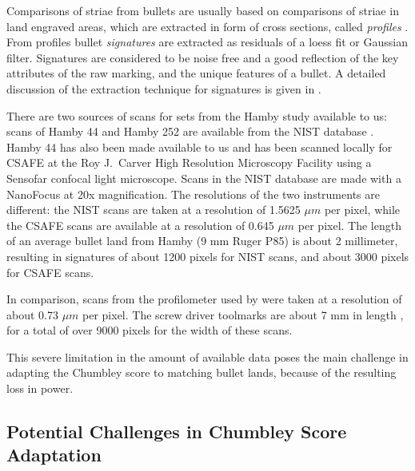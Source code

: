 \documentclass[12pt]{article}
\begin{document}
Comparisons of striae from bullets are usually based on comparisons of
striae in land engraved areas, which are extracted in form of cross
sections, called \emph{profiles} \citep{aoas,ma2004}. From profiles
bullet \emph{signatures} \citep{chu2013,aoas} are extracted as residuals
of a loess fit or Gaussian filter. Signatures are considered to be noise
free and a good reflection of the key attributes of the raw marking, and
the unique features of a bullet.
 A detailed
discussion of the extraction technique for signatures is given in
\citet{aoas}.

There are two sources of scans for sets from the Hamby study available
to us: scans of Hamby 44 and Hamby 252 are available from the NIST
database \citep{nist}. Hamby 44 has also been made available to us and
has been scanned locally for CSAFE at the Roy J.~Carver High Resolution
Microscopy Facility using a Sensofar confocal light microscope. Scans in
the NIST database are made with a NanoFocus at 20x magnification. The
resolutions of the two instruments are different: the NIST scans are
taken at a resolution of 1.5625 \(\mu m\) per pixel, while the CSAFE
scans are available at a resolution of 0.645 \(\mu m\) per pixel. The
length of an average bullet land from Hamby (9 mm Ruger P85) is about 2
millimeter, resulting in signatures of about 1200 pixels for NIST scans,
and about 3000 pixels for CSAFE scans.

In comparison, scans from the profilometer used by
\citet{chumbley, hadler} were taken at a resolution of about 0.73
\(\mu m\) per pixel. The screw driver toolmarks are about 7 mm in length
\citep{manytoolmarks1}, for a total of over 9000 pixels for the width of
these scans.

This severe limitation in the amount of available data poses the main
challenge in adapting the Chumbley score to matching bullet lands,
because of the resulting loss in power.

\subsection{Potential Challenges in Chumbley Score
Adaptation}\label{potential-challenges-in-chumbley-score-adaptation}

\end{document}
